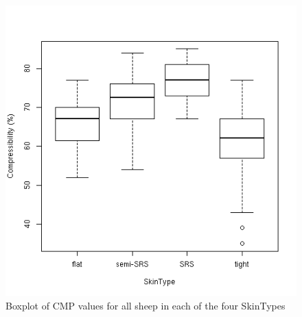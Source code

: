 %

\begin{figure}[!h]
  \centering
  \includegraphics[width=1.0\textwidth]{CMPskintype.png}
  \caption{Boxplot of CMP values for all sheep in each of the four SkinTypes}
  \label{fig:CMPskintype}
\end{figure}

%

